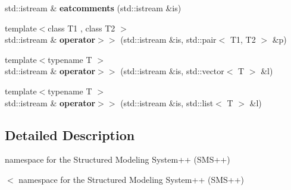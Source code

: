 \begin{DoxyCompactItemize}
std\+::istream \& {\bfseries eatcomments} (std\+::istream \&is)
\item 
{\footnotesize template$<$class T1 , class T2 $>$ }\\std\+::istream \& {\bfseries operator$>$$>$} (std\+::istream \&is, std\+::pair$<$ T1, T2 $>$ \&p)
\item 
{\footnotesize template$<$typename T $>$ }\\std\+::istream \& {\bfseries operator$>$$>$} (std\+::istream \&is, std\+::vector$<$ T $>$ \&l)
\item 
{\footnotesize template$<$typename T $>$ }\\std\+::istream \& {\bfseries operator$>$$>$} (std\+::istream \&is, std\+::list$<$ T $>$ \&l)
\end{DoxyCompactItemize}


\subsection{Detailed Description}
namespace for the Structured Modeling System++ (S\+M\+S++) 

$<$ namespace for the Structured Modeling System++ (S\+M\+S++) 